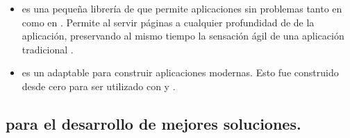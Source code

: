 \begin{itemize}
		\item
			\textbf{\rendrNAME} es una pequeña librería de \airbnbNAME \cite{online_technology_airbnb_officialsite} que permite \runCPT aplicaciones \backbonejsNAME sin problemas tanto en \clientSideAS como en \serverSideAS. Permite al \webserverINT servir páginas \htmlNAME \fullyFormedCPT a cualquier profundidad de \linkINT de la aplicación, preservando al mismo tiempo la sensación ágil de una aplicación \mvcAS \clientSideAS \backbonejsNAME tradicional \cite{online_technology_isomorphic_javascript_frameworks}.
		\item
			\textbf{\flatironNAME} es un \frameworkPC adaptable para construir aplicaciones \webINT modernas. Esto fue construido desde cero para ser utilizado con \javaScriptNAME y \nodejsNAME \cite{online_technology_flatiron_officialsite}.

	\end{itemize}

	

\subsection{\tools para el desarrollo de mejores soluciones.}

